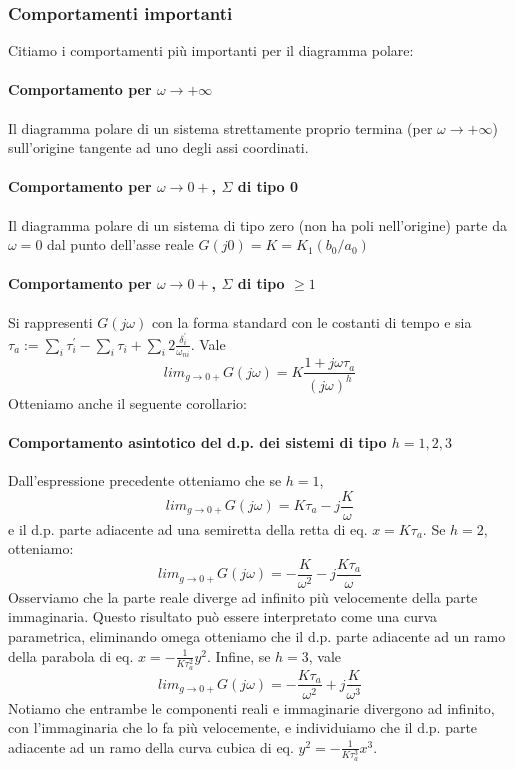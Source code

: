 \documentclass[11pt]{article}
\begin{document}
\subsubsection{Comportamenti importanti}
Citiamo i comportamenti più importanti per il diagramma polare:
\paragraph{Comportamento per $\omega\rightarrow+\infty$} Il diagramma polare di un sistema strettamente proprio termina (per $\omega\rightarrow+\infty$) sull'origine tangente ad uno degli assi coordinati.
\paragraph{Comportamento per $\omega\rightarrow0+$, $\Sigma$ di tipo 0} Il diagramma polare di un sistema di tipo zero (non ha poli nell'origine) parte da $\omega=0$ dal punto dell'asse reale $G(j0)=K=K_1(b_0/a_0)$
\paragraph{Comportamento per $\omega\rightarrow0+$, $\Sigma$ di tipo $\ge1$}
Si rappresenti $G(j\omega)$ con la forma standard con le costanti di tempo e sia $\tau_a := \sum_i \tau_i^{'} - \sum_i \tau_i + \sum_i 2\frac{\delta_i^{'}}{\omega_{ni}}$. Vale
\begin{displaymath}
    lim_{g\rightarrow0+} G(j\omega) = K\frac{1+j\omega\tau_a}{(j\omega)^h}
\end{displaymath}
Otteniamo anche il seguente corollario:
\paragraph{Comportamento asintotico del d.p. dei sistemi di tipo $h=1,2,3$}
Dall'espressione precedente otteniamo che se $h=1$,
\begin{displaymath}
    lim_{g\rightarrow0+} G(j\omega) = K\tau_a - j\frac{K}{\omega}
\end{displaymath}
e il d.p. parte adiacente ad una semiretta della retta di eq. $x=K\tau_a$.
Se $h=2$, otteniamo:
\begin{displaymath}
    lim_{g\rightarrow0+} G(j\omega) = -\frac{K}{\omega^2} - j\frac{K\tau_a}{\omega}
\end{displaymath}
Osserviamo che la parte reale diverge ad infinito più velocemente della parte immaginaria. Questo risultato può essere interpretato come una curva parametrica, eliminando omega otteniamo che il d.p. parte adiacente ad un ramo della parabola di eq. $x=-\frac{1}{K\tau_a^2}y^2$.
Infine, se $h=3$, vale
\begin{displaymath}
    lim_{g\rightarrow0+} G(j\omega) = -\frac{K\tau_a}{\omega^2} + j\frac{K}{\omega^3}
\end{displaymath}
Notiamo che entrambe le componenti reali e immaginarie divergono ad infinito, con l'immaginaria che lo fa più velocemente, e individuiamo che il d.p. parte adiacente ad un ramo della curva cubica di eq. $y^2=-\frac{1}{K\tau_a^3}x^3$.
\end{document}
